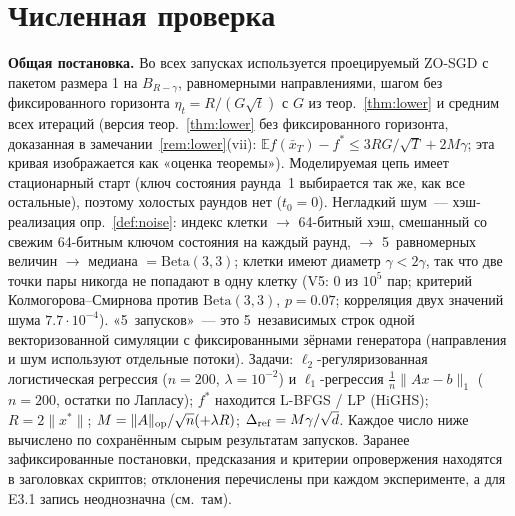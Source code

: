 \documentclass[11pt,a4paper]{article}
\numberwithin{equation}{section}
\theoremstyle{definition}
\theoremstyle{remark}
\newcommand{\E}{\mathbb E}\newcommand{\R}{\mathbb R}\newcommand{\Z}{\mathbb Z}\let\Prob\relax\newcommand{\Prob}{\mathbb P}
\newcommand{\norm}[1]{\lVert #1\rVert}\newcommand{\abs}[1]{\lvert #1\rvert}\newcommand{\ip}[2]{\langle #1,#2\rangle}
\begin{document}
\section{Численная проверка}\label{sec:num}
\textbf{Общая постановка.} Во всех запусках используется проецируемый ZO-SGD с пакетом размера 1 на $B_{R-\gamma}$, равномерными направлениями, шагом без фиксированного горизонта $\eta_t=R/(G\sqrt t)$ с $G$ из теор.~\ref{thm:lower} и средним всех итераций (версия теор.~\ref{thm:lower} без фиксированного горизонта, доказанная в замечании~\ref{rem:lower}(vii): $\E f(\bar x_T)-f^*\le3RG/\sqrt T+2M\gamma$; эта кривая изображается как «оценка теоремы»). Моделируемая цепь имеет стационарный старт (ключ состояния раунда~1 выбирается так же, как все остальные), поэтому холостых раундов нет ($t_0=0$). Негладкий шум~--- хэш-реализация опр.~\ref{def:noise}: индекс клетки $\to$ 64-битный хэш, смешанный со свежим 64-битным ключом состояния на каждый раунд, $\to$ 5~равномерных величин $\to$ медиана $=\mathrm{Beta}(3,3)$; клетки имеют диаметр $\gamma<2\gamma$, так что две точки пары никогда не попадают в одну клетку (V5: $0$ из $10^5$ пар; критерий Колмогорова--Смирнова против $\mathrm{Beta}(3,3)$, $p=0.07$; корреляция двух значений шума $7.7\cdot10^{-4}$). «5~запусков»~--- это 5~независимых строк одной векторизованной симуляции с фиксированными зёрнами генератора (направления и шум используют отдельные потоки). Задачи: $\ell_2$-регуляризованная логистическая регрессия ($n=200$, $\lambda=10^{-2}$) и $\ell_1$-регрессия $\frac1n\norm{Ax-b}_1$ ($n=200$, остатки по Лапласу); $f^*$ находится L-BFGS / LP (HiGHS); $R=2\norm{x^*}$; $M=\norm A_{\rm op}/\sqrt n(+\lambda R)$; $\Delta_{\rm ref}=M\gamma/\sqrt d$. Каждое число ниже вычислено по сохранённым сырым результатам запусков. Заранее зафиксированные постановки, предсказания и критерии опровержения находятся в заголовках скриптов; отклонения перечислены при каждом эксперименте, а для E3.1 запись неоднозначна (см.\ там).
\end{document}
